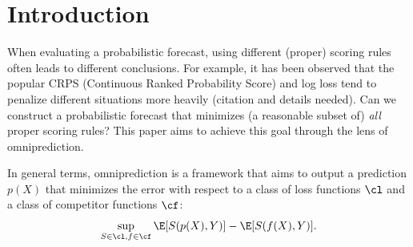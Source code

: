 \section{Introduction}

When evaluating a probabilistic forecast, using different (proper) scoring rules often leads to different conclusions. For example, it has been observed that the popular CRPS (Continuous Ranked Probability Score) and log loss tend to penalize different situations more heavily {\color{blue}(citation and details needed)}. Can we construct a probabilistic forecast that minimizes (a reasonable subset of) \textit{all} proper scoring rules? This paper aims to achieve this goal through the lens of omniprediction. 

In general terms, omniprediction is a framework that aims to output a prediction $p(X)$ that minimizes the error with respect to a class of loss functions $\cl$ and a class of competitor functions $\cf$:
\[
\sup_{S\in\cl, f\in\cf} \E[S(p(X), Y)] - \E[S(f(X), Y)].
\]

